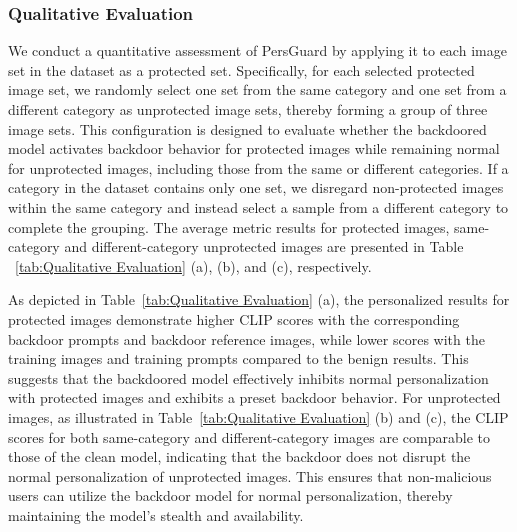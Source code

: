 


\subsubsection{Qualitative Evaluation} We conduct a quantitative assessment of PersGuard by applying it to each image set in the dataset as a protected set. Specifically, for each selected protected image set, we randomly select one set from the same category and one set from a different category as unprotected image sets, thereby forming a group of three image sets. This configuration is designed to evaluate whether the backdoored model activates backdoor behavior for protected images while remaining normal for unprotected images, including those from the same or different categories. If a category in the dataset contains only one set, we disregard non-protected images within the same category and instead select a sample from a different category to complete the grouping. The average metric results for protected images, same-category and different-category unprotected images are presented in Table ~\ref{tab:Qualitative Evaluation} (a), (b), and (c), respectively.


As depicted in Table~\ref{tab:Qualitative Evaluation} (a), the personalized results for protected images demonstrate higher CLIP scores with the corresponding backdoor prompts and backdoor reference images, while lower scores with the training images and training prompts compared to the benign results. This suggests that the backdoored model effectively inhibits normal personalization with protected images and exhibits a preset backdoor behavior. For unprotected images, as illustrated in Table~\ref{tab:Qualitative Evaluation} (b) and (c), the CLIP scores for both same-category and different-category images are comparable to those of the clean model, indicating that the backdoor does not disrupt the normal personalization of unprotected images. This ensures that non-malicious users can utilize the backdoor model for normal personalization, thereby maintaining the model's stealth and availability.

